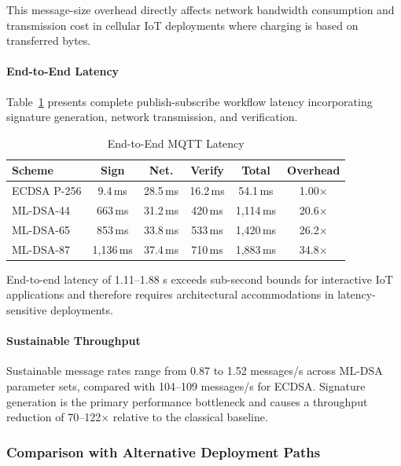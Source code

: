 \documentclass[final, twoside]{IEEEtran} %
\begin{document}
This message-size overhead directly affects network bandwidth consumption and transmission cost in cellular IoT deployments where charging is based on transferred bytes.

\paragraph{End-to-End Latency}

Table~\ref{tab:e2e-latency} presents complete publish-subscribe workflow latency incorporating signature generation, network transmission, and verification.

\begin{table}[h]
	\centering
	\caption{End-to-End MQTT Latency}
	\label{tab:e2e-latency}
	\begin{tabular}{lccccc}
		\toprule
		\textbf{Scheme} & \textbf{Sign} & \textbf{Net.} & \textbf{Verify} & \textbf{Total} & \textbf{Overhead} \\
		\midrule
		ECDSA P-256     & 9.4\,ms       & 28.5\,ms      & 16.2\,ms        & 54.1\,ms       & 1.00$\times$      \\
		ML-DSA-44       & 663\,ms       & 31.2\,ms      & 420\,ms         & 1,114\,ms      & 20.6$\times$      \\
		ML-DSA-65       & 853\,ms       & 33.8\,ms      & 533\,ms         & 1,420\,ms      & 26.2$\times$      \\
		ML-DSA-87       & 1,136\,ms     & 37.4\,ms      & 710\,ms         & 1,883\,ms      & 34.8$\times$      \\
		\bottomrule
	\end{tabular}
\end{table}

End-to-end latency of 1.11--1.88 s exceeds sub-second bounds for interactive IoT applications and therefore requires architectural accommodations in latency-sensitive deployments.

\paragraph{Sustainable Throughput}

Sustainable message rates range from 0.87 to 1.52 messages/s across ML-DSA parameter sets, compared with 104--109 messages/s for ECDSA. Signature generation is the primary performance bottleneck and causes a throughput reduction of 70--122$\times$ relative to the classical baseline.

\subsubsection{Comparison with Alternative Deployment Paths}
\end{document}
